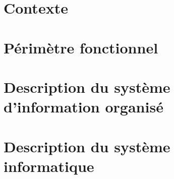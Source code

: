 

\newcommand{\mainTitle}{\'Etude préalable - SPIE}
\newcommand{\secondTitle}{\'Etude de l'\'Existant}
\newcommand{\documentRef}{DEB-EE/4401/1}




\listoftodos
\newpage

\tableofcontents
\listoffigures
\listoftables
\newpage

\part{Contexte}
\setcounter{section}{0}

\part{Périmètre fonctionnel}
\setcounter{section}{0}

\part{Description du système d'information organisé}
\setcounter{section}{0}

\part{Description du système informatique}
\setcounter{section}{0}





